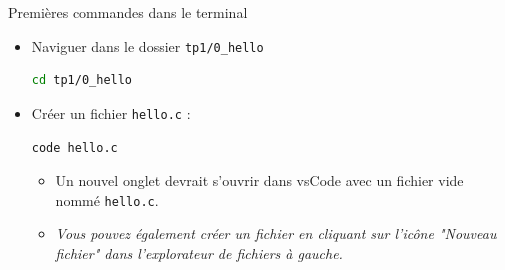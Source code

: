\begin{UPSTIManipulation}{Premières commandes dans le terminal}
\begin{itemize}
		\item[$\Box$] Naviguer dans le dossier \texttt{tp1/0\_hello}
		      \begin{lstlisting}[language=bash,style=console]
cd tp1/0_hello
\end{lstlisting}
		\item[$\Box$] Créer un fichier \texttt{hello.c} :
		      \begin{lstlisting}[language=bash,style=console]
code hello.c
\end{lstlisting}
		      \begin{itemize}
			      \item[$\Box$] Un nouvel onglet devrait s'ouvrir dans vsCode avec un fichier vide nommé \texttt{hello.c}.
			      \item \textit{Vous pouvez également créer un fichier en cliquant sur l'icône "Nouveau fichier" dans l'explorateur de fichiers à gauche.}
		      \end{itemize}
	\end{itemize}
\end{UPSTIManipulation}
